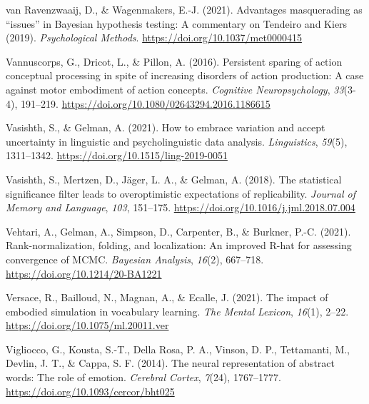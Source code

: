 \documentclass[
  12pt,
  man,floatsintext]{apa7}
\newlength{\cslhangindent}
\newlength{\cslentryspacingunit} %
\newenvironment{CSLReferences}[2] %
 {%
  \setlength{\parindent}{0pt}
  \ifodd #1
  \let\oldpar\par
  \def\par{\hangindent=\cslhangindent\oldpar}
  \fi
  \setlength{\parskip}{#2\cslentryspacingunit}
 }%
 {}
\begin{document}
\begin{CSLReferences}{1}{0}
\leavevmode{}%
van Ravenzwaaij, D., \& Wagenmakers, E.-J. (2021). Advantages masquerading as {``issues''} in {Bayesian} hypothesis testing: {A} commentary on {Tendeiro} and {Kiers} (2019). \emph{Psychological Methods}. \url{https://doi.org/10.1037/met0000415}

\leavevmode{}%
Vannuscorps, G., Dricot, L., \& Pillon, A. (2016). Persistent sparing of action conceptual processing in spite of increasing disorders of action production: {A} case against motor embodiment of action concepts. \emph{Cognitive Neuropsychology}, \emph{33}(3-4), 191--219. \url{https://doi.org/10.1080/02643294.2016.1186615}

\leavevmode{}%
Vasishth, S., \& Gelman, A. (2021). How to embrace variation and accept uncertainty in linguistic and psycholinguistic data analysis. \emph{Linguistics}, \emph{59}(5), 1311--1342. \url{https://doi.org/10.1515/ling-2019-0051}

\leavevmode{}%
Vasishth, S., Mertzen, D., Jäger, L. A., \& Gelman, A. (2018). The statistical significance filter leads to overoptimistic expectations of replicability. \emph{Journal of Memory and Language}, \emph{103}, 151--175. \url{https://doi.org/10.1016/j.jml.2018.07.004}

\leavevmode{}%
Vehtari, A., Gelman, A., Simpson, D., Carpenter, B., \& Burkner, P.-C. (2021). Rank-normalization, folding, and localization: {An} improved {R-hat} for assessing convergence of {MCMC}. \emph{Bayesian Analysis}, \emph{16}(2), 667--718. \url{https://doi.org/10.1214/20-BA1221}

\leavevmode{}%
Versace, R., Bailloud, N., Magnan, A., \& Ecalle, J. (2021). The impact of embodied simulation in vocabulary learning. \emph{The Mental Lexicon}, \emph{16}(1), 2--22. \url{https://doi.org/10.1075/ml.20011.ver}

\leavevmode{}%
Vigliocco, G., Kousta, S.-T., Della Rosa, P. A., Vinson, D. P., Tettamanti, M., Devlin, J. T., \& Cappa, S. F. (2014). The neural representation of abstract words: The role of emotion. \emph{Cerebral Cortex}, \emph{7}(24), 1767--1777. \url{https://doi.org/10.1093/cercor/bht025}


\end{CSLReferences}
\end{document}
